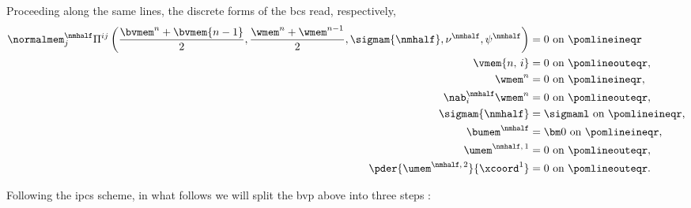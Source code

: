 Proceeding along the same lines, the discrete forms of the \acp{bc} \crefs{\bcsmembrane} read, respectively,
\bw
\begin{align}
        \label{bc_fl_mem_mem_1_disc_bis}
        \normalmem^\nmhalf_j \Pi^{ij}\left( \frac{\bvmem^n + \bvmem{n-1}}{2},\frac{\wmem^n + \wmem^{n-1}}{2}, \sigmam{\nmhalf}, \nu^\nmhalf, \psi^\nmhalf \right) & = 0 \text{ on } \pomlineineqr         \\
        \label{bc_fl_mem_mem_2_disc_bis}
        \vmem{n, \, i}                                                                                                                                             & = 0 \text{ on } \pomlineouteqr,       \\
        \label{bc_fl_mem_mem_3_disc_bis}
        \wmem^n                                                                                                                                                    & = 0 \text{ on } \pomlineineqr,        \\
        \label{bc_fl_mem_mem_4_disc_bis}
        \nab^\nmhalf_i \wmem^n                                                                                                                                     & = 0 \text{ on } \pomlineouteqr,       \\
        \label{bc_fl_mem_mem_5_disc_bis}
        \sigmam{\nmhalf}                                                                                                                                           & = \sigmaml \text{ on } \pomlineineqr, \\
        \label{bc_fl_mem_mem_6_disc_bis}
        \bumem^\nmhalf                                                                                                                                             & = {\bm 0} \text{ on } \pomlineineqr,  \\
        \label{bc_fl_mem_mem_7_disc_bis}
        \umem^{\nmhalf, \, 1}                                                                                                                                      & = 0 \text{ on } \pomlineouteqr,       \\
        \label{bc_fl_mem_mem_8_disc_bis}
        \pder{\umem^{\nmhalf, \, 2}}{\xcoord^1}                                                                                                                    & = 0 \text{ on } \pomlineouteqr.
\end{align}
\ew


Following the \ac{ipcs} scheme,  in what follows we will split the \ac{bvp} above into three steps  \cite{loggAutomatedSolutionDifferential2012,chorinNumericalSolutionNavierStokes1968}:

